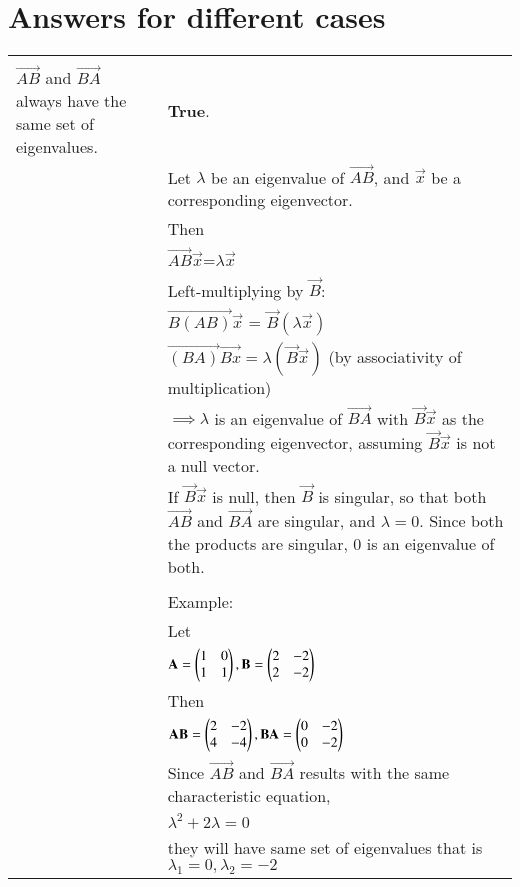 \documentclass[journal,12pt,twocolumn]{IEEEtran}
\newcommand\myemptypage{
	\null
	\thispagestyle{empty}
	\addtocounter{page}{-1}
	\newpage
}
\begin{document}
\section{Answers for different cases}
\pagebreak
\myemptypage
\begin{table}[h]
	\begin{tabular}{|m{3cm}|m{14cm}|}
		\hline
		&\\
		$\vec{AB}$ and $\vec{BA}$ always have the same set of eigenvalues.
		& \textbf{True}. \\
		& Let  $\lambda$  be an eigenvalue of  $\vec{AB}$, and $\vec{x}$  be a corresponding eigenvector.\\
		&Then \\
		& \qquad\qquad\qquad$\vec{AB} \vec{x}$=$\lambda \vec{x}$ \\
		& Left-multiplying by $\vec{B}$:\\
		&\qquad\qquad\qquad$\vec{B(AB)}\vec{x}$ = $\vec{B}(\lambda \vec{x})$\\
		& \qquad\qquad\qquad$\vec{(BA)}\vec{Bx}=\lambda(\vec{B}\vec{x})$  (by associativity of multiplication)\\
	    & $\implies  \lambda $ is an eigenvalue of  $\vec{BA}$  with  $\vec{B}\vec{x}$  as the corresponding eigenvector, assuming  $\vec{B}\vec{x}$  is not a null vector.\\
		&If  $\vec{B}\vec{x}$   is null, then  $\vec{B}$   is singular, so that both  $\vec{AB}$ and  $\vec{BA}$ are singular, and  $\lambda=0$. Since both the products are singular,  0  is an eigenvalue of both.\\
		&\\
		& Example:\\
		& Let \\
		&\qquad\qquad\qquad$\mathbf{A} = \begin{pmatrix}1 & 0 \\ 1 & 1\end{pmatrix}, \mathbf{B} = \begin{pmatrix}2 & -2 \\ 2 & -2\end{pmatrix}$\\
		&Then\\
		& \qquad\qquad\qquad$\mathbf{AB} = \begin{pmatrix}2 & -2 \\ 4 & -4\end{pmatrix}, \mathbf{BA} = \begin{pmatrix}0 & -2 \\ 0 & -2\end{pmatrix}$\\
		& Since $\vec{AB}$ and $\vec{BA}$ results with the same characteristic equation,\\
		& \qquad\qquad\qquad $\lambda^2 + 2\lambda = 0$\\
		&they will have same set of eigenvalues that is $\lambda_1 = 0, \lambda_2 = -2$\\

\end{tabular}
\end{table}
\end{document}
